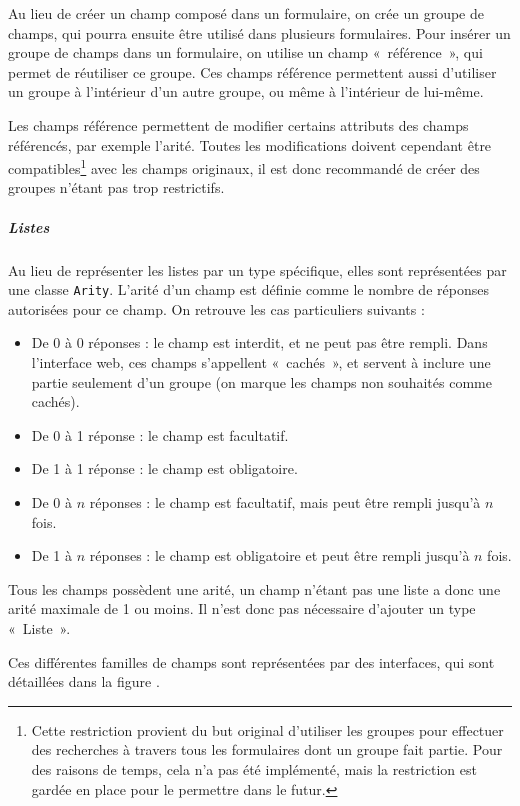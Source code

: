 Au lieu de créer un champ composé dans un formulaire, on crée un groupe de champs, qui pourra ensuite être utilisé dans plusieurs formulaires.
Pour insérer un groupe de champs dans un formulaire, on utilise un champ «~référence~», qui permet de réutiliser ce groupe.
Ces champs référence permettent aussi d'utiliser un groupe à l'intérieur d'un autre groupe, ou même à l'intérieur de lui-même.

Les champs référence permettent de modifier certains attributs des champs référencés, par exemple l'arité.
Toutes les modifications doivent cependant être compatibles\footnote{Cette restriction provient du but original d'utiliser les groupes pour effectuer des recherches à travers tous les formulaires dont un groupe fait partie. Pour des raisons de temps, cela n'a pas été implémenté, mais la restriction est gardée en place pour le permettre dans le futur.} avec les champs originaux, il est donc recommandé de créer des groupes n'étant pas trop restrictifs.

\subparagraph{Listes}
Au lieu de représenter les listes par un type spécifique, elles sont représentées par une classe \lstinline{Arity}.
L'arité d'un champ est définie comme le nombre de réponses autorisées pour ce champ.
On retrouve les cas particuliers suivants :
\begin{itemize}
	\item De 0 à 0 réponses : le champ est interdit, et ne peut pas être rempli.
	Dans l'interface web, ces champs s'appellent «~cachés~», et servent à inclure une partie seulement d'un groupe (on marque les champs non souhaités comme cachés).
	\item De 0 à 1 réponse : le champ est facultatif.
	\item De 1 à 1 réponse : le champ est obligatoire.
	\item De 0 à $n$ réponses : le champ est facultatif, mais peut être rempli jusqu'à $n$ fois.
	\item De 1 à $n$ réponses : le champ est obligatoire et peut être rempli jusqu'à $n$ fois.
\end{itemize}

Tous les champs possèdent une arité, un champ n'étant pas une liste a donc une arité maximale de 1 ou moins.
Il n'est donc pas nécessaire d'ajouter un type «~Liste~».

\uparagraph
Ces différentes familles de champs sont représentées par des interfaces, qui sont détaillées dans la figure .

